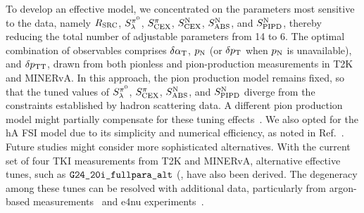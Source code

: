 To develop an effective model, we concentrated on the parameters most sensitive to the data, namely $R_\textrm{SRC}$, $S_\lambda^{\pi^{0}}$, $S_\textrm{CEX}^{\pi}$, $S_\textrm{CEX}^\textrm{N}$, $S_\textrm{ABS}^\textrm{N}$, and $S_\textrm{PIPD}^\textrm{N}$, thereby reducing the total number of adjustable parameters from 14 to 6. 
The optimal combination of observables comprises $\delta\alpha_\textrm{T}$, $p_\textrm{N}$ (or $\delta p_\textrm{T}$ when $p_\textrm{N}$ is unavailable), and $\delta p_\textrm{TT}$, drawn from both pionless and pion-production measurements in T2K and MINERvA. 
In this approach, the pion production model remains fixed, so that the tuned values of $S_\lambda^{\pi^{0}}$, $S_\textrm{CEX}^{\pi}$, $S_\textrm{ABS}^\textrm{N}$, and $S_\textrm{PIPD}^\textrm{N}$ diverge from the constraints established by hadron scattering data. 
A different pion production model might partially compensate for these tuning effects~\cite{Yan:2024kkg}. 
We also opted for the hA FSI model due to its simplicity and numerical efficiency, as noted in Ref.~\cite{GENIE:2022qrc}.
Future studies might consider more sophisticated alternatives. 
With the current set of four TKI measurements from T2K and MINERvA, alternative effective tunes, such as $\texttt{G24\_20i\_fullpara\_alt}$ (\gT\), have also been derived. 
The degeneracy among these tunes can be resolved with additional data, particularly from argon-based measurements~\cite{MicroBooNE:2022emb, MicroBooNE:2023cmw, MicroBooNE:2023tzj, MicroBooNE:2023wzy, MicroBooNE:2024tmp, MicroBooNE:2015bmn} and e4nu experiments~\cite{CLAS:2021neh}.



